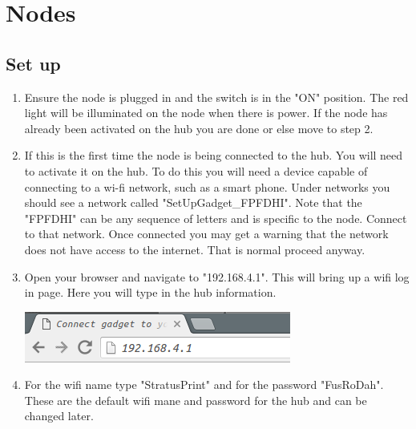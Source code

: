   \section{Nodes}
  \subsection{Set up}
    \begin{enumerate}
      \item Ensure the node is plugged in and the switch is in the "ON" position.
      The red light will be illuminated on the node when there is power. If the node
      has already been activated on the hub you are done or else move to step 2.

      \item If this is the first time the node is being connected to the hub.
      You will need to activate it on the hub. To do this you will need a device
      capable of connecting to a wi-fi network, such as a smart phone. Under networks
      you should see a network called "SetUpGadget\_FPFDHI". Note that the "FPFDHI"
      can be any sequence of letters and is specific to the node. Connect to that network.
      Once connected you may get a warning that the network does not have access
      to the internet. That is normal proceed anyway.

      \item Open your browser and navigate to "192.168.4.1". This will bring up
      a wifi log in page. Here you will type in the hub information.
      \begin{center}
      \includegraphics[scale=1]{images/ip-enter.png}
    \end{center}

      \item For the wifi name type "StratusPrint" and for the password "FusRoDah".
      These are the default wifi mane and password for the hub and can be changed later.


\end{enumerate}
